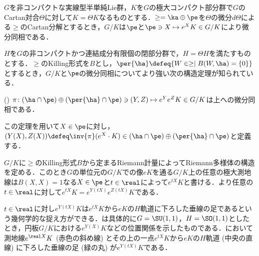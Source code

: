 $G$を非コンパクトな実線型半単純Lie群，$K$を$G$の極大コンパクト部分群で$G$のCartan対合$\Theta$に対して$K = \Theta K $なるものとする．$\ge = \ka \oplus \pe $を$\Theta$の微分$d\Theta$による$\ge$のCartan分解とするとき，$G/K$は$\pe$と$\pe \ni X\mapsto e^{X}K\in G/K $により微分同相である．

$H$を$G$の非コンパクトかつ連結成分有限個の閉部分群で，$H = \Theta H$を満たすものとする．$\ge$のKilling形式を$B$とし，$\per{\ha}\defeq \{W\in \ge\mid B(W, \ha) = \{0\} \} $とするとき，$G/K$と$\pe$の微分同相についてより強い次の構造定理が知られている．

\begin{thm*}(\cite[Lemma~6.1]{kob89})\label{thm:kob89-lem6.1}  
  $\pi\colon  (\ha\cap\pe)\oplus (\per{\ha}\cap \pe) \ni (Y, Z)\mapsto e^{Y}e^{Z}K \in G/K $は上への微分同相である．
\end{thm*}
この定理を用いて$X\in \pe$に対し，${(Y(X), Z(X))\defeq \inv{\pi}(e^X\cdot K)\in (\ha\cap\pe)\oplus (\per{\ha}\cap \pe)}$と定義する．

$G/K$に$\ge$のKilling形式$B$から定まるRiemann計量によってRiemann多様体の構造を定める．このとき$G$の単位元の$G/K$での像$eK$を通る$G/K$上の任意の極大測地線は$B(X, X) = 1 $なる$X\in \pe$と$t\in \real$によって$e^{tX}K $と書ける．より任意の$t\in \real$に対して$e^{tX}K = e^{Y(tX)}e^{Z(tX)}K $である．

$t\in \real$に対し$e^{Y(tX)}K $は$e^{tX}K $から$eK$の$H$軌道に下ろした垂線の足であるという幾何学的な捉え方ができる．は具体的に$G = \SU(1,1) $，$H = \SO(1,1) $としたとき，{\Poincare}円板$G/K$における$e^{Y(X)}K $などの位置関係を示したものである．において測地線$e^{\real X}K$ (赤色の斜め線) とその上の一点$e^{tX}K$から$eK$の$H$軌道 (中央の直線) に下ろした垂線の足 (緑の丸) が$e^{Y(tX)}K $である．



